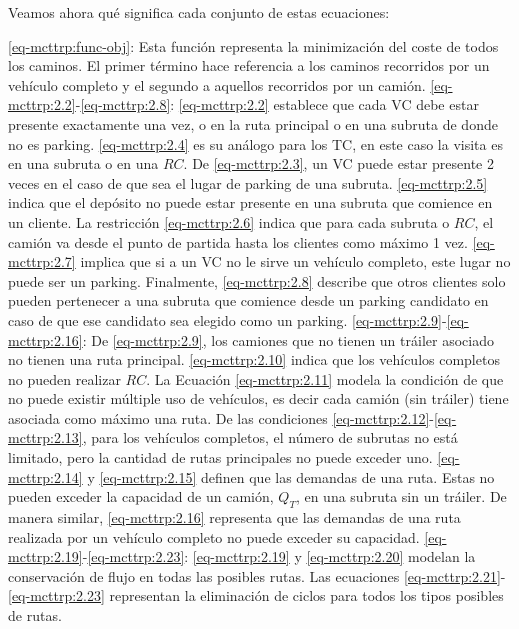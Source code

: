 Veamos ahora qué significa cada conjunto de estas ecuaciones:
\begin{itemize}
     \eqref{eq-mcttrp:func-obj}: Esta función representa la minimización del coste de todos los caminos. El primer término hace referencia a los caminos recorridos por un vehículo completo y el segundo a aquellos recorridos por un camión.
     \eqref{eq-mcttrp:2.2}-\eqref{eq-mcttrp:2.8}: \eqref{eq-mcttrp:2.2} establece que cada VC debe estar presente exactamente una vez, o en la ruta principal o en una subruta de donde no es parking. \eqref{eq-mcttrp:2.4} es su análogo para los TC, en este caso la visita es en una subruta o en una $RC$. De \eqref{eq-mcttrp:2.3}, un VC puede estar presente 2 veces en el caso de que sea el lugar de parking de una subruta. \eqref{eq-mcttrp:2.5} indica que el depósito no puede estar presente en una subruta que comience en un cliente. La restricción \eqref{eq-mcttrp:2.6} indica que para cada subruta o $RC$, el camión va desde el punto de partida hasta los clientes como máximo 1 vez. \eqref{eq-mcttrp:2.7} implica que si a un VC no le sirve un vehículo completo, este lugar no puede ser un parking. Finalmente, \eqref{eq-mcttrp:2.8} describe que otros clientes solo pueden pertenecer a una subruta que comience desde un parking candidato en caso de que ese candidato sea elegido como un parking.
     \eqref{eq-mcttrp:2.9}-\eqref{eq-mcttrp:2.16}: De \eqref{eq-mcttrp:2.9}, los camiones que no tienen un tráiler asociado no tienen una ruta principal. \eqref{eq-mcttrp:2.10} indica que los vehículos completos no pueden realizar $RC$. La Ecuación \eqref{eq-mcttrp:2.11} modela la condición de que no puede existir múltiple uso de vehículos, es decir cada camión (sin tráiler) tiene asociada como máximo una ruta. De las condiciones \eqref{eq-mcttrp:2.12}-\eqref{eq-mcttrp:2.13}, para los vehículos completos, el número de subrutas no está limitado, pero la cantidad de rutas principales no puede exceder uno. \eqref{eq-mcttrp:2.14} y \eqref{eq-mcttrp:2.15} definen que las demandas de una ruta. Estas no pueden exceder la capacidad de un camión, $Q_T$, en una subruta sin un tráiler. De manera similar, \eqref{eq-mcttrp:2.16} representa que las demandas de una ruta realizada por un vehículo completo no puede exceder su capacidad.
     \eqref{eq-mcttrp:2.19}-\eqref{eq-mcttrp:2.23}: \eqref{eq-mcttrp:2.19} y \eqref{eq-mcttrp:2.20} modelan la conservación de flujo en todas las posibles rutas. Las ecuaciones \eqref{eq-mcttrp:2.21}-\eqref{eq-mcttrp:2.23} representan la eliminación de ciclos para todos los tipos posibles de rutas. 

\end{itemize}
